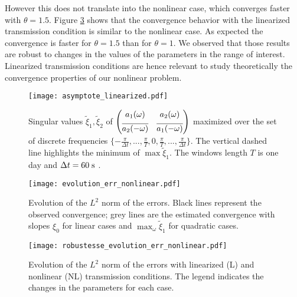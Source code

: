 However this does not translate into the nonlinear case, which converges faster with $\theta=1.5$.
Figure \ref{fig:robustesseEvolutionErrNonlinear}
shows that the convergence behavior with the linearized transmission condition is
similar to the nonlinear case.
As expected the convergence is faster for $\theta=1.5$
than for $\theta=1$.
We observed that those results are robust to changes in the values of the parameters in the range of interest.
Linearized transmission conditions are hence relevant to study
theoretically the
convergence properties of our nonlinear problem.
\begin{figure}
    \centering
    \texttt{[image: asymptote\_linearized.pdf]}
	\caption{Singular values
	$\widetilde{\xi}_1, \widetilde{\xi}_2$ of $\begin{pmatrix}
	a_1(\omega) & a_2(\omega) \vspace{0.15cm}\\
	\overline{a_2(-\omega)} & \overline{a_1(-\omega)} \\
	\end{pmatrix}$ maximized over the set of discrete
	frequencies
	$\{-\frac{\pi}{\Delta t}, ..., \frac{\pi}{T}, 0,
	\frac{\pi}{T},..., \frac{\pi}{\Delta t}\}$.
	The vertical dashed line highlights the minimum
	of $\max \widetilde{\xi}_1$.
	The windows length $T$ is one day
	and $\Delta t=60\;{\rm s}$ .
	}
    \label{fig:OASchwarz_nonasymptotic}
\end{figure}
\begin{figure}
    \centering
    \texttt{[image: evolution\_err\_nonlinear.pdf]}
    \caption{Evolution of the  $L^2$ norm of the errors. Black lines represent the observed convergence; grey lines are the estimated convergence with slopes $\xi_0$ for linear cases and $\max_\omega \widetilde{\xi}_1$ for quadratic cases.}
    \label{fig:evolutionErrNonlinear}
\end{figure}
\begin{figure}
    \centering
    \texttt{[image: robustesse\_evolution\_err\_nonlinear.pdf]}
    \caption{Evolution of the  $L^2$ norm of the errors with linearized (L) and nonlinear (NL) transmission conditions. The legend indicates the changes in the parameters for each case. }
    \label{fig:robustesseEvolutionErrNonlinear}
\end{figure}
%
